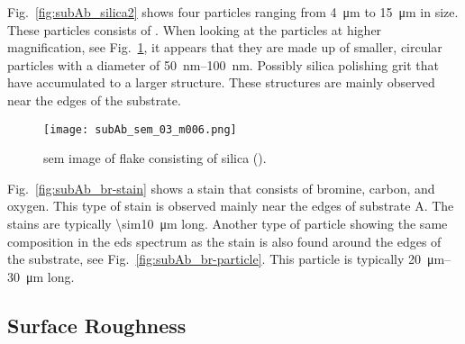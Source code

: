 Fig.~\ref{fig:subAb_silica2} shows four particles ranging from \SI{4}{\micro\metre} to \SI{15}{\micro\metre} in size. These particles consists of . When looking at the particles at higher magnification, see Fig.~\ref{fig:subAb_silica2_magnified}, it appears that they are made up of smaller, circular particles with a diameter of \SIrange{50}{100}{\nano\metre}. Possibly silica polishing grit that have accumulated to a larger structure. These structures are mainly observed near the edges of the substrate.

\begin{figure}
    \centering
    \texttt{[image: subAb\_sem\_03\_m006.png]}
    \caption[\Ac{sem} image of silica flake.]{\Acf{sem} image of flake consisting of silica ().}\label{fig:subAb_silica2_magnified}
\end{figure}

Fig.~\ref{fig:subAb_br-stain} shows a stain that consists of bromine, carbon, and oxygen. This type of stain is observed mainly near the edges of substrate A. The stains are typically \SI{\sim10}{\micro\metre} long. Another type of particle showing the same composition in the \ac{eds} spectrum as the stain is also found around the edges of the substrate, see Fig.~\ref{fig:subAb_br-particle}. This particle is typically \SIrange{20}{30}{\micro\metre} long.

\subsection{Surface Roughness}


